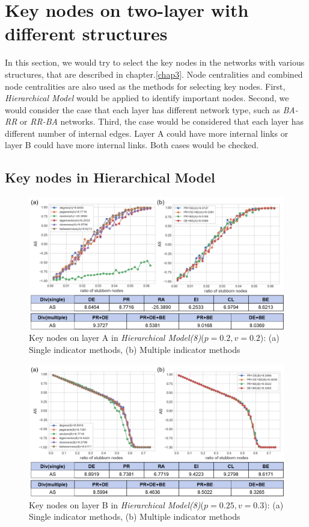 \section{Key nodes on two-layer with different structures}
In this section, we would try to select the key nodes in the networks with various structures, that are described in chapter.\ref{chap3}. Node centralities and combined node centralities are also used as the methods for selecting key nodes. First, \textit{Hierarchical Model} would be applied to identify important nodes. Second, we would consider the case that each layer has different network type, such as \textit{BA-RR} or \textit{RR-BA} networks. Third, the case would be considered that each layer has different number of internal edges. Layer A could have more internal links or layer B could have more internal links. Both cases would be checked. \\

\subsection{Key nodes in Hierarchical Model}
\begin{figure}[!htb]
	\centering
	\includegraphics[width=\hsize]{figure/chap5_keynode_HM_A.png}
	\caption{Key nodes on layer A in \textit{Hierarchical Model(8)}($p=0.2, v=0.2$):
		(a) Single indicator methods, (b) Multiple indicator methods}
	\label{chap5_keynode_HM_A}
\end{figure}
\begin{figure}[!htb]
	\centering
	\includegraphics[width=\hsize]{figure/chap5_keynode_HM_B.png}
	\caption{Key nodes on layer B in \textit{Hierarchical Model(8)}($p=0.25, v=0.3$):
		(a) Single indicator methods, (b) Multiple indicator methods}
	\label{chap5_keynode_HM_B}
\end{figure}

